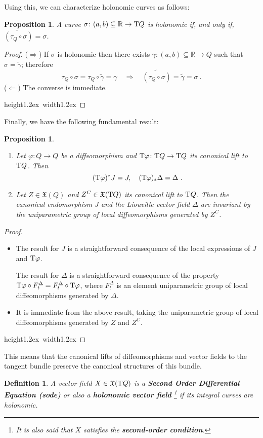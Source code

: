 \documentclass[12pt]{report}
\newtheorem{prop}[teor]{Proposition}
\newtheorem{definition}[teor]{Definition}
\def\ben{\begin{enumerate}}
\def\een{\end{enumerate}}
\def\bit{\begin{itemize}}
\def\eit{\end{itemize}}
\def\qed{\ifvmode\removelastskip\fi
{\unskip\nobreak\hfil\penalty50\hbox{}\nobreak\hfil
\hbox{\vrule height1.2ex width1.2ex}\parfillskip=0pt
\finalhyphendemerits=0 \par\smallskip}}
\def\vf{\mathfrak X}
\def\Real{\mathbb{R}}
\def\Tan{{\rm T}}
\begin{document}
Using this, we can characterize holonomic curves as follows: 

\begin{prop}
A curve $\sigma\colon (a,b)\subseteq\Real\to\Tan Q$ is 
holonomic if, and only if,
$\widetilde{(\tau_Q\circ\sigma)}=\sigma$.
\end{prop}
\begin{proof}
($\Longrightarrow$) \quad
If $\sigma$ is holonomic then there exists $\gamma\colon (a,b)\subseteq\Real\to Q$
such that $\sigma=\widetilde  \gamma$; therefore
$$
\tau_Q\circ\sigma=\tau_Q\circ\widetilde  \gamma=\gamma
\quad \Longrightarrow \quad
\widetilde{(\tau_Q\circ\sigma)}=\widetilde  \gamma=\sigma \ .
$$
($\Longleftarrow$) \quad
The converse is immediate.
\\ \qed  \end{proof}

Finally, we have the following fundamental result:

\begin{prop}
\label{lema2}
\ben
\item
Let $\varphi\colon Q\to Q$ be a diffeomorphism and
$\Tan\varphi\colon \Tan Q \to \Tan Q$ its canonical lift to $\Tan Q$. Then
$$
(\Tan\varphi)^*J = J,\quad
(\Tan\varphi)_*\Delta=\Delta \ .
$$
\item
Let $Z\in\vf (Q)$ and $Z^C\in\vf(\Tan Q)$  its canonical lift to $\Tan Q$.
Then the canonical endomorphism $J$ and the Liouville vector field $\Delta$
are invariant by the uniparametric group of local diffeomorphisms generated by $Z^C$.
\label{constq}
\een
\end{prop}
\begin{proof}
\bit
\item
The result for $J$ is  a straightforward consequence of the local expressions
of $J$ and $\Tan\varphi$.

The result for $\Delta$ is  a straightforward consequence of the property
$\Tan\varphi\circ F_t^\Delta=F_t^\Delta\circ\Tan\varphi$,
where $F_t^\Delta$ is an element uniparametric group of local diffeomorphisms generated by $\Delta$.
\item
It is immediate from the above result, taking the
uniparametric group of local diffeomorphisms generated by $Z$ and $Z^C$.
\eit
\qed  \end{proof}

This means that the canonical lifts of diffeomorphisms and vector fields
to the tangent bundle preserve the canonical structures of this bundle.

\begin{definition}
A vector field $X\in\vf(\Tan Q)$ is a
\textbf{Second Order Differential Equation ({\sc sode})}
or also a \textbf{holonomic vector field}
\footnote{It is also said that $X$ satisfies the 
\textbf{second-order condition}.}
if its integral curves are holonomic.
\end{definition}
\end{document}
